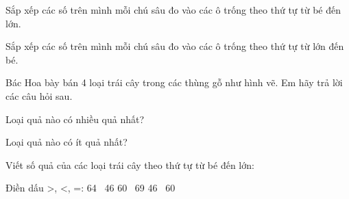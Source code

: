 \documentclass[../main.tex]{subfiles}
\begin{document}
\begin{bt}
    Sắp xếp các số trên mình mỗi chú sâu đo vào các ô trống theo thứ tự từ bé đến lớn.
    \par\nopagebreak\vspace{4pt}
\end{bt}

\begin{bt}
    Sắp xếp các số trên mình mỗi chú sâu đo vào các ô trống theo thứ tự từ lớn đến bé.
    \par\nopagebreak\vspace{4pt}
\end{bt}

\begin{bt}
    Bác Hoa bày bán 4 loại trái cây trong các thùng gỗ như hình vẽ. Em hãy trả lời các câu hỏi sau.
    \par\nopagebreak\vspace{4pt}
    \begin{listEX}
        \item Loại quả nào có nhiều quả nhất? \TTcham[4cm]
        \item Loại quả nào có ít quả nhất? \TTcham[4cm]
        \item Viết số quả của các loại trái cây theo thứ tự từ bé đến lớn: \TTcham[5.5cm]
        \item Điền dấu \textgreater, \textless, =: \hspace{0.5cm} 64 \SSo\ 46 \hspace{0.8cm} 60 \SSo\ 69 \hspace{0.8cm} 46 \SSo\ 60
    \end{listEX}
\end{bt}
\end{document}
